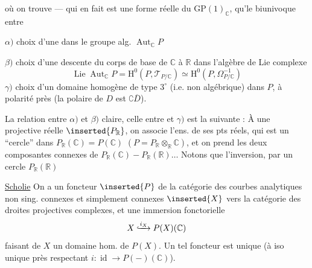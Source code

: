  où on trouve  --- qui en fait est une forme réelle du $\mathrm{GP}(1)_{\mathbb C}$,  qu'le   biunivoque entre

$\alpha)$ choix d'une  dans le groupe alg.  $\operatorname{Aut}_{\mathbb C}P$

$\beta)$ choix d'une descente du corps de base de $\mathbb C$ à $\mathbb R$ dans l'algèbre de Lie complexe
\[
\operatorname{Lie}\operatorname{Aut}_{\mathbb C}P=\mathrm H^0(P,\mathcal T_{P/\mathbb C})\simeq\mathrm H^0(P,\Omega^{-1}_{P/\mathbb C})
\]
$\gamma)$ choix d'un domaine homogène de type $3^\circ$ (i.e. non algébrique) dans $P$, à polarité près (la polaire de $D$ est $\complement\overline D$).

La relation entre $\alpha)$ et $\beta)$ claire, celle entre \unsure{$\delta)$|$\alpha)$} et $\gamma)$ est la suivante : À une  projective réelle $\inserted{P_{\mathbb R}}$, on associe l'ens. de ses pts réels, qui est un ``cercle'' dans $P_{\mathbb R}(\mathbb C)=P(\mathbb C)$ $(P=P_{\mathbb R}\otimes_{\mathbb R}\mathbb C)$, et on prend les deux composantes connexes de $P_{\mathbb R}(\mathbb C)-P_{\mathbb R}(\mathbb R)\ldots$ Notons que l'inversion, par un cercle $P_{\mathbb R}(\mathbb R)$

\uline{Scholie} On a un foncteur $\inserted{P}$ de la catégorie des courbes analytiques non sing. connexes et simplement connexes $\inserted{X}$ vers la catégorie des droites projectives complexes, et une immersion fonctorielle
\[X\lhook\joinrel\xrightarrow{i_X}P(X)(\mathbb C)\]
faisant de $X$ un domaine  hom. de $P(X)$.
Un tel foncteur est unique (à iso unique près respectant $i:\operatorname{id}\longrightarrow P(-)(\mathbb C)$).

